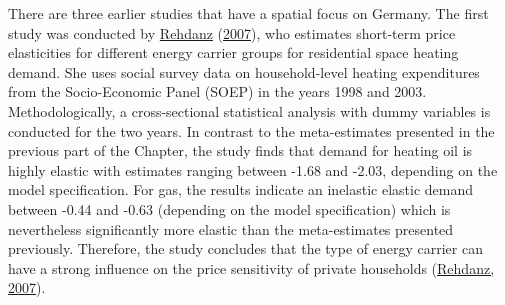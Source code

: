\documentclass[12pt,twoside]{reedthesis}
\begin{document}
There are three earlier studies that have a spatial focus on Germany. The first study was conducted by \protect\hyperlink{ref-rehdanz07}{Rehdanz} (\protect\hyperlink{ref-rehdanz07}{2007}), who estimates short-term price elasticities for different energy carrier groups for residential space heating demand. She uses social survey data on household-level heating expenditures from the Socio-Economic Panel (SOEP) in the years 1998 and 2003. Methodologically, a cross-sectional statistical analysis with dummy variables is conducted for the two years. In contrast to the meta-estimates presented in the previous part of the Chapter, the study finds that demand for heating oil is highly elastic with estimates ranging between -1.68 and -2.03, depending on the model specification. For gas, the results indicate an inelastic elastic demand between -0.44 and -0.63 (depending on the model specification) which is nevertheless significantly more elastic than the meta-estimates presented previously. Therefore, the study concludes that the type of energy carrier can have a strong influence on the price sensitivity of private households (\protect\hyperlink{ref-rehdanz07}{Rehdanz, 2007}).
\end{document}
